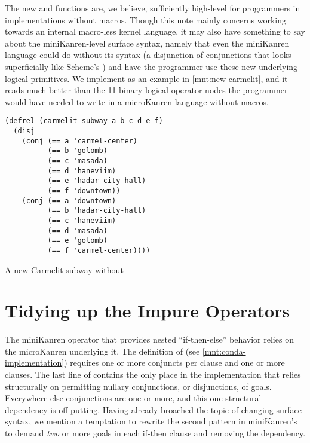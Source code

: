\documentclass[sigplan,draft,balance,pbalance,natbib=false]{acmart}
\begin{document}
The new  and  functions are, we
believe, sufficiently high-level for programmers in implementations
without macros. Though this note mainly concerns working towards an
internal macro-less kernel language, it may also have something to say
about the miniKanren-level surface syntax, namely that even the
miniKanren language could do without its  syntax (a
disjunction of conjunctions that looks superficially like
Scheme's ) and have the programmer use these new
underlying logical primitives. We
implement  as an example in
\cref{mnt:new-carmelit}, and it reads much better than the 11 binary
logical operator nodes the programmer would have needed to write in a
microKanren language without macros.

\begin{listing}[h]
  \begin{verbatim}
(defrel (carmelit-subway a b c d e f)
  (disj
    (conj (== a 'carmel-center)
          (== b 'golomb)
          (== c 'masada)
          (== d 'haneviim)
          (== e 'hadar-city-hall)
          (== f 'downtown))
    (conj (== a 'downtown)
          (== b 'hadar-city-hall)
          (== c 'haneviim)
          (== d 'masada)
          (== e 'golomb)
          (== f 'carmel-center))))
  \end{verbatim}
  \caption{A new Carmelit subway without }
  \label{mnt:new-carmelit}
\end{listing}

\section{Tidying up the Impure Operators}\label{sec:impure}

The miniKanren  operator that provides nested
\enquote{if-then-else} behavior relies on the
microKanren  underlying it. The definition
of  (see \cref{mnt:conda-implementation}) requires
one or more conjuncts per clause and one or more clauses. The last
line of  contains the only place in the
implementation that relies structurally on permitting nullary
conjunctions, or disjunctions, of goals. Everywhere else conjunctions
are one-or-more, and this one structural dependency is off-putting.
Having already broached the topic of changing surface syntax, we
mention a temptation to rewrite the second pattern in
miniKanren's  to demand \emph{two} or more goals in
each if-then clause and removing the dependency.
\end{document}
